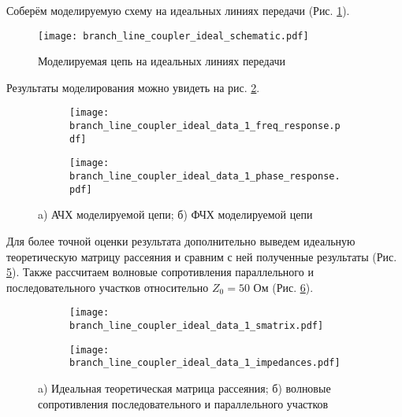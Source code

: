 Соберём моделируемую схему на идеальных линиях передачи (Рис. \ref{fig:branch_line_coupler_ideal_schematic}).

\begin{figure}[!ht]
    \centering
    \texttt{[image: branch\_line\_coupler\_ideal\_schematic.pdf]}
    \caption{Моделируемая цепь на идеальных линиях передачи}
    \label{fig:branch_line_coupler_ideal_schematic}
\end{figure}

Результаты моделирования можно увидеть на рис. \ref{fig:branch_line_coupler_ideal_data_1_freq_response}.

\begin{figure}[!ht]
    \centering
    \begin{subfigure}[b]{0.45\textwidth}
        \centering
        \texttt{[image: branch\_line\_coupler\_ideal\_data\_1\_freq\_response.pdf]}
        \caption{}
        \label{fig:branch_line_coupler_ideal_data_1_freq_response}
    \end{subfigure}
    \hfill
    \begin{subfigure}[b]{0.45\textwidth}
        \centering
        \texttt{[image: branch\_line\_coupler\_ideal\_data\_1\_phase\_response.pdf]}
        \caption{}
        \label{fig:branch_line_coupler_ideal_data_1_phase_response}
    \end{subfigure}
    \caption{
        a) АЧХ моделируемой цепи;
        б) ФЧХ моделируемой цепи
    }
    \label{fig:branch_line_coupler_ideal_data_display_1}
\end{figure}

Для более точной оценки результата дополнительно выведем идеальную теоретическую матрицу рассеяния и сравним с ней полученные результаты (Рис. \ref{fig:branch_line_coupler_ideal_data_1_smatrix}).
Также рассчитаем волновые сопротивления параллельного и последовательного участков относительно $Z_0 = 50 \text{~Ом}$ (Рис. \ref{fig:branch_line_coupler_ideal_data_1_impedances}).

\begin{figure}[!ht]
    \centering
    \begin{subfigure}[b]{0.7\textwidth}
        \centering
        \texttt{[image: branch\_line\_coupler\_ideal\_data\_1\_smatrix.pdf]}
        \caption{}
        \label{fig:branch_line_coupler_ideal_data_1_smatrix}
    \end{subfigure}
    \vfill
    \begin{subfigure}[b]{0.7\textwidth}
        \centering
        \texttt{[image: branch\_line\_coupler\_ideal\_data\_1\_impedances.pdf]}
        \caption{}
        \label{fig:branch_line_coupler_ideal_data_1_impedances}
    \end{subfigure}
    \caption{
        a) Идеальная теоретическая матрица рассеяния;
        б) волновые сопротивления последовательного и параллельного участков
    }
    \label{fig:branch_line_coupler_ideal_data_display_2}
\end{figure}


